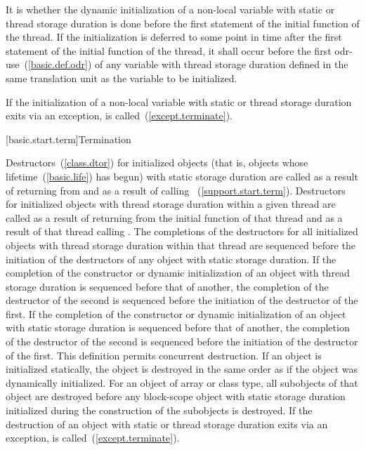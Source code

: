 \pnum
It is  whether the
dynamic initialization of a non-local variable with static or
thread storage duration
is done before the first statement of the initial function of the thread. If the
initialization is deferred to some point in time after the first statement of the
initial function of the thread, it shall occur before the first
odr-use~(\ref{basic.def.odr}) of any variable with
thread storage duration defined in the same translation unit as the variable to be
initialized.

\pnum
If the initialization of a non-local variable with static or thread storage duration
exits via
an exception,  is called~(\ref{except.terminate}).%

[basic.start.term]{Termination}

\pnum
{}%
%
%
Destructors~(\ref{class.dtor}) for initialized objects
(that is, objects whose lifetime~(\ref{basic.life}) has begun)
with static storage duration
are called as a result of returning from  and as a result of calling
%
%
~(\ref{support.start.term}).
Destructors for initialized objects with thread storage duration within a given thread
are called as a result of returning from the initial function of that thread and as a
result of that thread calling .
The completions of the destructors for all initialized objects with thread storage
duration within that thread are sequenced before the initiation of the destructors of
any object with static storage duration.
If the completion of the constructor or dynamic initialization of an object with thread
storage duration is sequenced before that of another, the completion of the destructor
of the second is sequenced before the initiation of the destructor of the first.
If the completion of the constructor or dynamic initialization of an object with static
storage duration is sequenced before that of another, the completion of the destructor
of the second is sequenced before the initiation of the destructor of the first.
\enternote This definition permits concurrent destruction. \exitnote If an object is
initialized statically, the object is destroyed in the same order as if
the object was dynamically initialized. For an object of array or class
type, all subobjects of that object are destroyed before any block-scope
object with static storage duration initialized during the construction
of the subobjects is destroyed.
If the destruction of an object with static or thread storage duration
exits via an exception,
 is called~(\ref{except.terminate}).

